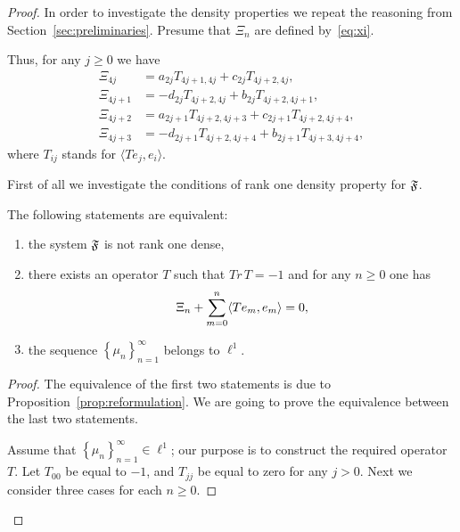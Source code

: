     \begin{proof}
      In order to investigate the density properties we repeat the reasoning from Section~\ref{sec:preliminaries}.
      Presume that $\Xi_n$ are defined by~\eqref{eq:xi}.

      Thus, for any $j \geq 0$ we have
      \begin{equation}
        \label{eq:xi5}
        \begin{aligned}
          \Xi_{4j} &= a_{2j} T_{4j+1, 4j} + c_{2j} T_{4j+2, 4j},\\
          \Xi_{4j + 1} &= -d_{2j} T_{4j+2, 4j} + b_{2j} T_{4j+2, 4j+1},\\
          \Xi_{4j + 2} &= a_{2j+1} T_{4j+2, 4j+3} + c_{2j+1} T_{4j+2, 4j+4},\\
          \Xi_{4j + 3} &= -d_{2j+1} T_{4j+2, 4j+4} + b_{2j+1} T_{4j+3, 4j+4},
        \end{aligned}
      \end{equation}
        where $T_{ij}$ stands for $\langle Te_j, e_i \rangle$.

      First of all we investigate the conditions of rank one density property for $\mathfrak{F}$.
      \begin{prop}
        \label{prop:inf-dim}
        The following statements are equivalent:
        \begin{enumerate}
          \item the system $\mathfrak{F}$ is not rank one dense,
          \item there exists an operator $T$ such that $Tr\,T = -1$ and for any $n \geq 0$ one has \[\Xi_n + \sum_{m=0}^n \langle Te_m, e_m \rangle = 0,\]
          \item the sequence $\left\{\mu_n\right\}_{n=1}^\infty$ belongs to $\ell^1$.
        \end{enumerate}
      \end{prop}
      \begin{proof}
        The equivalence of the first two statements is due to Proposition~\ref{prop:reformulation}.
        We are going to prove the equivalence between the last two statements.

        Assume that $\left\{\mu_n\right\}_{n=1}^\infty \in \ell^1$; our purpose is to construct the required operator $T$.
        Let $T_{00}$ be equal to $-1$, and $T_{jj}$ be equal to zero for any $j > 0$.
        Next we consider three cases for each $n \geq 0$.


\end{proof}
\end{proof}
